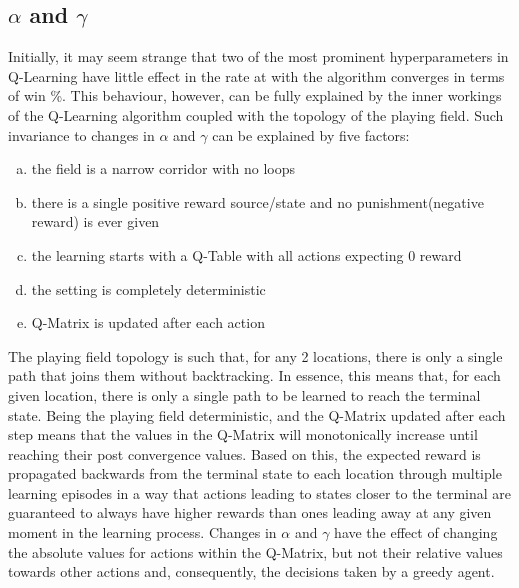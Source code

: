 \documentclass[10pt]{article}
\begin{document}
    \subsection{$\alpha$ and $\gamma$}\label{sec:quali:gamma}
        Initially, it may seem strange that two of the most prominent hyperparameters in Q-Learning have little effect in the rate at with the algorithm converges in terms of win \%. This behaviour, however, can be fully explained by the inner workings of the Q-Learning algorithm coupled with the topology of the playing field. Such invariance to changes in $\alpha$ and $\gamma$ can be explained by five factors:
        \begin{enumerate}[a)]
            \item the field is a narrow corridor with no loops
            \item there is a single positive reward source/state and no punishment(negative reward) is ever given
            \item the learning starts with a Q-Table with all actions expecting 0 reward
            \item the setting is completely deterministic
            \item Q-Matrix is updated after each action
        \end{enumerate}
        The playing field topology is such that, for any 2 locations, there is only a single path that joins them without backtracking. In essence, this means that, for each given location, there is only a single path to be learned to reach the terminal state. Being the playing field deterministic, and the Q-Matrix updated after each step means that the values in the Q-Matrix will monotonically increase until reaching their post convergence values. Based on this, the expected reward is propagated backwards from the terminal state to each location through multiple learning episodes in a way that actions leading to states closer to the terminal are guaranteed to always have higher rewards than ones leading away at any given moment in the learning process. Changes in $\alpha$ and $\gamma$ have the effect of changing the absolute values for actions within the Q-Matrix, but not their relative values towards other actions and, consequently, the decisions taken by a greedy agent.
\end{document}
